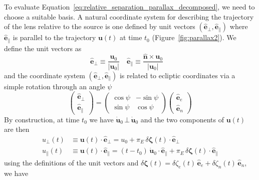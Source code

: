 \documentclass[11pt]{report}
\begin{document}
To evaluate Equation~\ref{eq:relative_separation_parallax_decomposed}, we need
to choose a suitable basis. A natural coordinate system for describing the
trajectory of the lens relative to the source is one defined by unit vectors
$(\mathbf{\hat e}_\bot,\mathbf{\hat e}_\parallel)$ where $\mathbf{\hat e}_\parallel$ is parallel to the trajectory $\mathbf{u}(t)$ at time $t_0$
(Figure~\ref{fig:parallax2}). We define the unit vectors as
\begin{equation}
    \mathbf{\hat e}_\bot\equiv \frac{\mathbf{u}_0}{|\mathbf{u}_0|}\quad
    \mathbf{\hat e}_\parallel\equiv \frac{\mathbf{\hat n}\times\mathbf{u}_0}{|\mathbf{u}_0|}\quad
\end{equation}
and the coordinate system $(\mathbf{\hat e}_\bot,\mathbf{\hat e}_\parallel)$ is related to ecliptic coordinates via a simple rotation through an
angle $\psi$
\begin{equation}
    \begin{pmatrix}
        \mathbf{\hat e}_\bot \\
        \mathbf{\hat e}_\parallel
    \end{pmatrix}
    =
    \begin{pmatrix}
        \cos\psi & -\sin\psi \\
        \sin\psi & \cos\psi
    \end{pmatrix}
    \begin{pmatrix}
        \mathbf{\hat e}_e \\
        \mathbf{\hat e}_n
    \end{pmatrix}
    \label{eq:ecliptic_to_parallel}
\end{equation}
By construction, at time $t_0$ we have
$\mathbf{\dot u}_0\,\bot\,\dot{\mathbf{u}}_0$ and the two components of
$\mathbf{u}(t)$ are then
\begin{align}
    u_\bot(t)      & \equiv \mathbf{u}(t)\cdot \mathbf{\hat e}_\bot= u_0 +
    \pi_E\,\delta\boldsymbol \zeta(t)\cdot\mathbf{\hat e}_\bot                                                                                                                                       \\
    u_\parallel(t) & \equiv \mathbf{u}(t)\cdot \mathbf{\hat e}_\parallel= (t-t_0)\,\dot{\mathbf{u}}_0\cdot\mathbf{\hat e}_\parallel+ \pi_E\,\delta\boldsymbol \zeta(t)\cdot\mathbf{\hat e}_\parallel
\end{align}
using the definitions of the unit vectors and
$\delta\boldsymbol \zeta(t)=
    \delta \zeta_e(t)\,\mathbf{\hat e}_e+\delta \zeta_n(t)\,\mathbf{\hat e}_n$, we have
\end{document}
